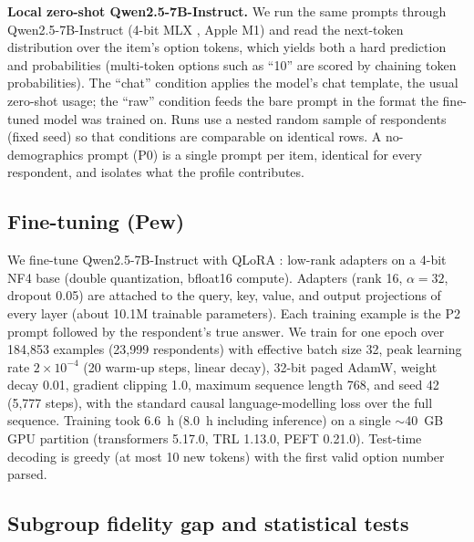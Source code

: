 \documentclass[conference]{IEEEtran}
\begin{document}
\textbf{Local zero-shot Qwen2.5-7B-Instruct.} We run the same prompts through Qwen2.5-7B-Instruct \cite{qwen2025} (4-bit MLX \cite{mlx2023}, Apple M1) and read the next-token distribution over the item's option tokens, which yields both a hard prediction and probabilities (multi-token options such as ``10'' are scored by chaining token probabilities). The ``chat'' condition applies the model's chat template, the usual zero-shot usage; the ``raw'' condition feeds the bare prompt in the format the fine-tuned model was trained on. Runs use a nested random sample of respondents (fixed seed) so that conditions are comparable on identical rows. A no-demographics prompt (P0) is a single prompt per item, identical for every respondent, and isolates what the profile contributes.

\subsection{Fine-tuning (Pew)}

We fine-tune Qwen2.5-7B-Instruct with QLoRA \cite{dettmers2023}: low-rank adapters \cite{hu2022} on a 4-bit NF4 base (double quantization, bfloat16 compute). Adapters (rank 16, $\alpha{=}32$, dropout 0.05) are attached to the query, key, value, and output projections of every layer (about 10.1M trainable parameters). Each training example is the P2 prompt followed by the respondent's true answer. We train for one epoch over 184{,}853 examples (23{,}999 respondents) with effective batch size 32, peak learning rate $2\times10^{-4}$ (20 warm-up steps, linear decay), 32-bit paged AdamW, weight decay 0.01, gradient clipping 1.0, maximum sequence length 768, and seed 42 (5{,}777 steps), with the standard causal language-modelling loss over the full sequence. Training took 6.6~h (8.0~h including inference) on a single $\sim$40~GB GPU partition (transformers 5.17.0, TRL 1.13.0, PEFT 0.21.0). Test-time decoding is greedy (at most 10 new tokens) with the first valid option number parsed.

\subsection{Subgroup fidelity gap and statistical tests}
\end{document}

